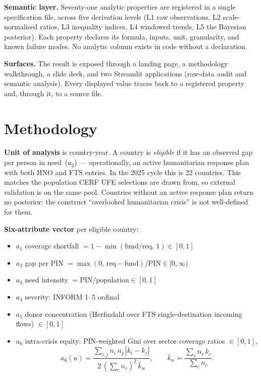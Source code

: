 \documentclass[11pt,a4paper]{article}
\begin{document}
\textbf{Semantic layer.} Seventy-one analytic properties are registered in
a single specification file, across five derivation levels (L1 raw
observations, L2 scale-normalised ratios, L3 inequality indices, L4 windowed
trends, L5 the Bayesian posterior). Each property declares its formula,
inputs, unit, granularity, and known failure modes. No analytic column
exists in code without a declaration.

\textbf{Surfaces.} The result is exposed through a landing page, a
methodology walkthrough, a slide deck, and two Streamlit applications
(raw-data audit and semantic analysis). Every displayed value traces back
to a registered property and, through it, to a source file.

\section{Methodology}\label{sec:method}

\textbf{Unit of analysis} is country-year. A country is \emph{eligible} if it
has an observed gap per person in need~($a_2$) --- operationally, an active
humanitarian response plan with both HNO and FTS entries. In the 2025 cycle
this is 22 countries. This matches the population CERF UFE selections are
drawn from, so external validation is on the same pool. Countries without
an active response plan return no posterior: the construct ``overlooked
humanitarian crisis'' is not well-defined for them.

\textbf{Six-attribute vector} per eligible country:
\begin{itemize}[leftmargin=1.2em,itemsep=0pt,topsep=1pt]
  \item $a_1$ coverage shortfall $= 1 - \min(\text{fund}/\text{req},\,1) \in [0,1]$
  \item $a_2$ gap per PIN $= \max(0,\,\text{req}-\text{fund})/\text{PIN} \in [0,\infty)$
  \item $a_3$ need intensity $= \text{PIN}/\text{population} \in [0,1]$
  \item $a_4$ severity: INFORM 1--5 ordinal
  \item $a_5$ donor concentration (Herfindahl over FTS single-destination incoming flows) $\in [0,1]$
  \item $a_6$ intra-crisis equity: PIN-weighted Gini over sector coverage ratios $\in [0,1]$,
  \[
  a_6(u) = \frac{\sum_{i,j} n_i\,n_j\,|k_i - k_j|}{2\,(\sum_c n_c)^2\,\bar k_w},\qquad
  \bar k_w = \frac{\sum_c n_c\,k_c}{\sum_c n_c}.
  \]
\end{itemize}
\end{document}
